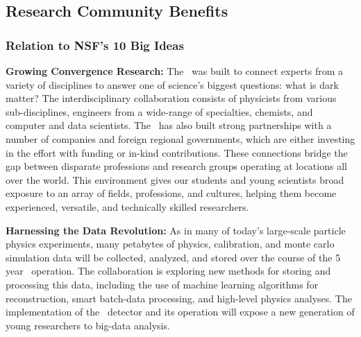 \subsection{Research Community Benefits}

\subsubsection{Relation to NSF's 10 Big Ideas}

{\bf Growing Convergence Research:}
The \GADMC\ was built to connect experts from a variety of disciplines to answer one of science's biggest questions: what is dark matter? The interdisciplinary collaboration consists of physicists from various sub-disciplines, engineers from a wide-range of specialties, chemists, and computer and data scientists.  The \GADMC\ has also built strong partnerships with a number of companies and foreign regional governments, which are either investing in the effort with funding or in-kind contributions. These connections bridge the gap between disparate professions and research groups operating at locations all over the world. This environment gives our students and young scientists broad exposure to an array of fields, professions, and cultures, helping them become experienced, versatile, and technically skilled researchers.

{\bf Harnessing the Data Revolution:}
As in many of today's large-scale particle physics experiments, many petabytes of physics, calibration, and monte carlo simulation data will be collected, analyzed, and stored over the course of the 5 year \DSks\ operation. The collaboration is exploring new methods for storing and processing this data, including the use of machine learning algorithms for reconstruction, smart batch-data processing, and high-level physics analyses.  The implementation of the \DSks\ detector and its operation will expose a new generation of young researchers to big-data analysis. 

